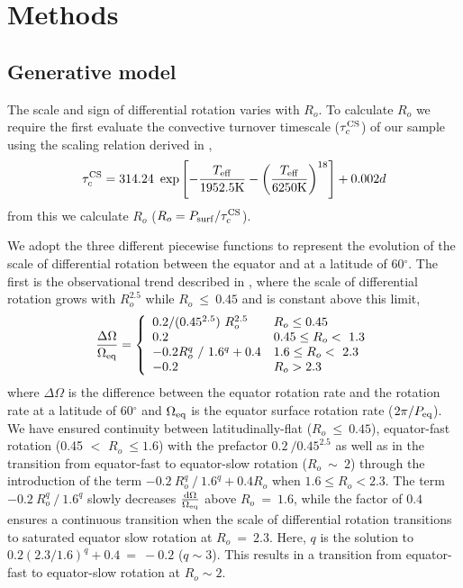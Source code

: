 \section{Methods}
\label{sec:methods}

\subsection{Generative model}

The scale and sign of differential rotation varies with $R_o$.
To calculate $R_o$ we require the first evaluate the convective turnover timescale ($\tau_c^{\rm{CS}}$) of our sample using the scaling relation derived in \citet{cranmer_testing_2011},
\begin{equation}
	\tau_c^{\rm{CS}} = 314.24 \ \exp\left[ -\frac{T_{\rm{eff}}}{1952.5\rm{K}} - \left( \frac{T_{\rm{eff}}}{6250 \rm{K}}\right)^{18}\right] + 0.002 d
\end{equation}
from this we calculate $R_o$ ($R_o = P_{\rm{surf}}/\tau_c^{\rm{CS}}$).

We adopt the three different piecewise functions to represent the evolution of the scale of differential rotation between the equator and at a latitude of 60$^{\circ}$.
The first is the observational trend described in \citet{saar_starspots_2011}, where the scale of differential rotation grows with $R_o^{2.5}$ while $R_o \ \leq \ 0.45$ and is constant above this limit,
\begin{equation}
\label{eq:rot_saar}
{\centering
\frac{\Delta\Omega}{\Omega_{\rm{eq}}} = \left\{
\begin{array}{ll}
  0.2/(0.45^{2.5}) \ R_o^{2.5}& R_o\leq 0.45 \\
  0.2 & 0.45 \leq R_o < \ 1.3\\
  -0.2 R_o^q \ / \ 1.6^q + 0.4 & 1.6 \leq R_o < \ 2.3\\
  -0.2 & R_o > 2.3
\end{array} 
\right.}
\end{equation}
where $\Delta \Omega$ is the difference between the equator rotation rate and the rotation rate at a latitude of 60$^{\circ}$ and $\Omega_{\rm{eq}}$ is the equator surface rotation rate ($2\pi/P_{\rm{eq}}$).
We have ensured continuity between latitudinally-flat ($R_o \ \leq \ 0.45$), equator-fast rotation (0.45 $<$ $R_o \ \leq 1.6$) with the prefactor $0.2 \ / 0.45^{2.5}$ as well as in the transition from equator-fast to equator-slow rotation ($R_o \ \sim \ 2$) through the introduction of the term $-0.2 \ R_o^q \ / \ 1.6^q + 0.4 R_o$ when $1.6 \leq R_o < 2.3$.
The term $-0.2 \ R_o^q \ / \ 1.6^q$ slowly decreases $\frac{\rm{d}\Omega}{\Omega_{\rm{eq}}}$ above $R_o \ = \ 1.6$, while the factor of $0.4$ ensures a continuous transition when the scale of differential rotation transitions to saturated equator slow rotation at $R_o \ = \ 2.3$.
Here, $q$ is the solution to $0.2 \left(2.3/1.6\right)^q + 0.4 \ = \ -0.2 $ ($q \sim 3$).
This results in a transition from equator-fast to equator-slow rotation at $R_o \sim 2$.

